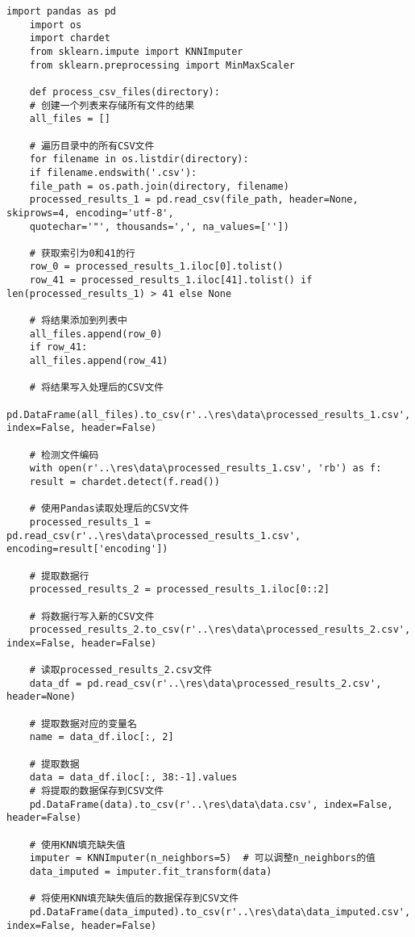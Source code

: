 \begin{lstlisting}[caption={数据预处理代码}]
	import pandas as pd
	import os
	import chardet
	from sklearn.impute import KNNImputer
	from sklearn.preprocessing import MinMaxScaler
	
	def process_csv_files(directory):
	# 创建一个列表来存储所有文件的结果
	all_files = []
	
	# 遍历目录中的所有CSV文件
	for filename in os.listdir(directory):
	if filename.endswith('.csv'):
	file_path = os.path.join(directory, filename)        
	processed_results_1 = pd.read_csv(file_path, header=None, skiprows=4, encoding='utf-8',
	quotechar='"', thousands=',', na_values=[''])
	
	# 获取索引为0和41的行
	row_0 = processed_results_1.iloc[0].tolist()
	row_41 = processed_results_1.iloc[41].tolist() if len(processed_results_1) > 41 else None
	
	# 将结果添加到列表中
	all_files.append(row_0)
	if row_41:
	all_files.append(row_41)
	
	# 将结果写入处理后的CSV文件
	pd.DataFrame(all_files).to_csv(r'..\res\data\processed_results_1.csv', index=False, header=False)
	
	# 检测文件编码
	with open(r'..\res\data\processed_results_1.csv', 'rb') as f:
	result = chardet.detect(f.read())
	
	# 使用Pandas读取处理后的CSV文件
	processed_results_1 = pd.read_csv(r'..\res\data\processed_results_1.csv', encoding=result['encoding'])
	
	# 提取数据行
	processed_results_2 = processed_results_1.iloc[0::2]
	
	# 将数据行写入新的CSV文件
	processed_results_2.to_csv(r'..\res\data\processed_results_2.csv', index=False, header=False)
	
	# 读取processed_results_2.csv文件
	data_df = pd.read_csv(r'..\res\data\processed_results_2.csv', header=None)
	
	# 提取数据对应的变量名
	name = data_df.iloc[:, 2]
	
	# 提取数据
	data = data_df.iloc[:, 38:-1].values
	# 将提取的数据保存到CSV文件
	pd.DataFrame(data).to_csv(r'..\res\data\data.csv', index=False, header=False)
	
	# 使用KNN填充缺失值
	imputer = KNNImputer(n_neighbors=5)  # 可以调整n_neighbors的值
	data_imputed = imputer.fit_transform(data)
	
	# 将使用KNN填充缺失值后的数据保存到CSV文件
	pd.DataFrame(data_imputed).to_csv(r'..\res\data\data_imputed.csv', index=False, header=False)
	

\end{lstlisting}

